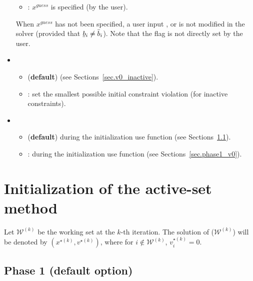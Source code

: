 \documentclass[12pt,a4paper]{article}
\newcommand{\ubar}[1]{\underaccent{\bar}{#1}}
\begin{document}
\begin{itemize}
\begin{itemize}
  \item[\ding{237}] : $x^{\mathit{guess}}$ is specified (by the user).

  \end{itemize} 

  \noindent When $x^{\mathit{guess}}$ has not been specified, a user input ,
   or  is not modified in the solver (provided that
  $\ubar{b}_i \neq \bar{b}_i$). Note that the flag  is not directly set
  by the user.

\item {}

  \begin{itemize}
  \item[\ding{237}]  ({\bf default}) (see Sections~\ref{sec.v0_inactive}).

  \item[\ding{237}] : set the smallest possible initial constraint violation (for inactive constraints).
  \end{itemize} 

\item {}

  \begin{itemize}
  \item[\ding{237}]  ({\bf default}) during the initialization use function  (see Sections~\ref{sec.phase1}).

  \item[\ding{237}] : during the initialization use function  (see Sections~\ref{sec.phase1_v0}).
  \end{itemize} 
  
\end{itemize}

\clearpage

\section{Initialization of the active-set method}

Let $\mathcal{W}^{(k)}$ be the working set at the $k$-th iteration. The solution of
($\mathcal{W}^{(k)}$) will be denoted by $(x^{\star(k)},v^{\star(k)})$, where for
$i\not\in \mathcal{W}^{(k)}$, $v_i^{\star(k)} = 0$.

\subsection{Phase 1 (default option)} \label{sec.phase1}
\end{document}
